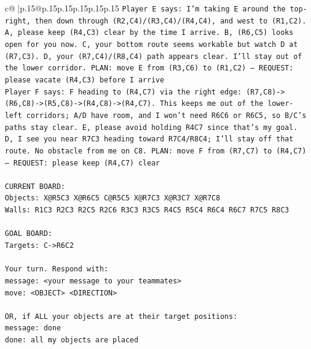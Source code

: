 \documentclass{article}
\begin{document}
{\begin{supertabular}{c@{$\;$}|p{.15\linewidth}@{}p{.15\linewidth}p{.15\linewidth}p{.15\linewidth}p{.15\linewidth}p{.15\linewidth}}
{{{\texttt{Player E says: I’m taking E around the top{-}right, then down through (R2,C4)/(R3,C4)/(R4,C4), and west to (R1,C2). A, please keep (R4,C3) clear by the time I arrive. B, (R6,C5) looks open for you now. C, your bottom route seems workable but watch D at (R7,C3). D, your (R7,C4)/(R8,C4) path appears clear. I’ll stay out of the lower corridor. PLAN: move E from (R3,C6) to (R1,C2) — REQUEST: please vacate (R4,C3) before I arrive} \\
\texttt{Player F says: F heading to (R4,C7) via the right edge: (R7,C8){-}>(R6,C8){-}>(R5,C8){-}>(R4,C8){-}>(R4,C7). This keeps me out of the lower{-}left corridors; A/D have room, and I won't need R6C6 or R6C5, so B/C's paths stay clear. E, please avoid holding R4C7 since that's my goal. D, I see you near R7C3 heading toward R7C4/R8C4; I'll stay off that route. No obstacle from me on C8. PLAN: move F from (R7,C7) to (R4,C7) — REQUEST: please keep (R4,C7) clear} \\
\\ 
\texttt{CURRENT BOARD:} \\
\texttt{Objects: X@R5C3 X@R6C5 C@R5C5 X@R7C3 X@R3C7 X@R7C8} \\
\texttt{Walls: R1C3 R2C3 R2C5 R2C6 R3C3 R3C5 R4C5 R5C4 R6C4 R6C7 R7C5 R8C3} \\
\\ 
\texttt{GOAL BOARD:} \\
\texttt{Targets: C{-}>R6C2} \\
\\ 
\texttt{Your turn. Respond with:} \\
\texttt{message: <your message to your teammates>} \\
\texttt{move: <OBJECT> <DIRECTION>} \\
\\ 
\texttt{OR, if ALL your objects are at their target positions:} \\
\texttt{message: done} \\
\texttt{done: all my objects are placed} \\
            }
        }
    }
     \\ \\


\end{supertabular}}
\end{document}

